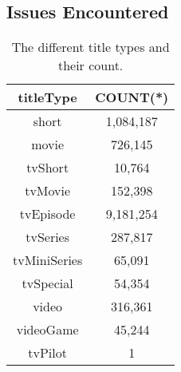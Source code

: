 \subsection{Issues Encountered}

\begin{table}
  \caption{The different title types and their count.}
  \label{tab:title-types}
  \begin{tabular}{cc}
    \toprule
    \textbf{titleType} & \textbf{COUNT(*)} \\
    \midrule
    short           & 1,084,187 \\
    movie           & 726,145   \\
    tvShort         & 10,764    \\
    tvMovie         & 152,398   \\
    tvEpisode       & 9,181,254 \\
    tvSeries        & 287,817   \\
    tvMiniSeries    & 65,091    \\
    tvSpecial       & 54,354    \\
    video           & 316,361   \\
    videoGame       & 45,244    \\
    tvPilot         & 1         \\
    \bottomrule
  \end{tabular}
\end{table}